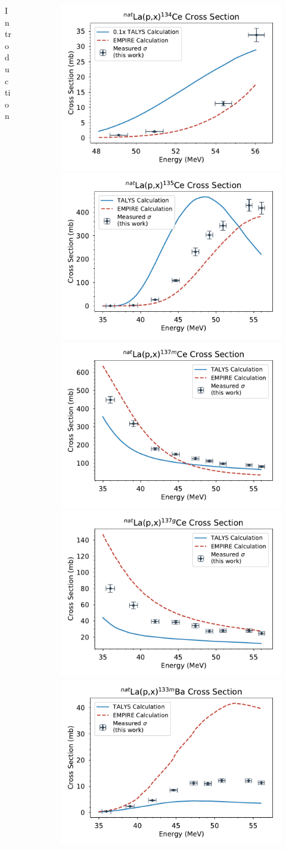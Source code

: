 \documentclass[final]{beamer}
\newlength{\sepwid}
\newlength{\onecolwid}
\newlength{\twocolwid}
\begin{document}
\begin{frame}[t]
\begin{columns}[t]
\begin{column}{\onecolwid}
\begin{block}{Introduction}
\end{block}
\end{column} %
\begin{column}{\sepwid}\end{column} %
\begin{column}{\twocolwid} %

\begin{figure}
\includegraphics[width=0.32\linewidth]{cross_sections/134CE.pdf}
\includegraphics[width=0.32\linewidth]{cross_sections/135CE.pdf}
\includegraphics[width=0.32\linewidth]{cross_sections/137CEm.pdf}\\
\includegraphics[width=0.32\linewidth]{cross_sections/137CEg.pdf}
\includegraphics[width=0.32\linewidth]{cross_sections/133BAm.pdf}

\end{figure}
\end{column}
\end{columns}
\end{frame}
\end{document}
